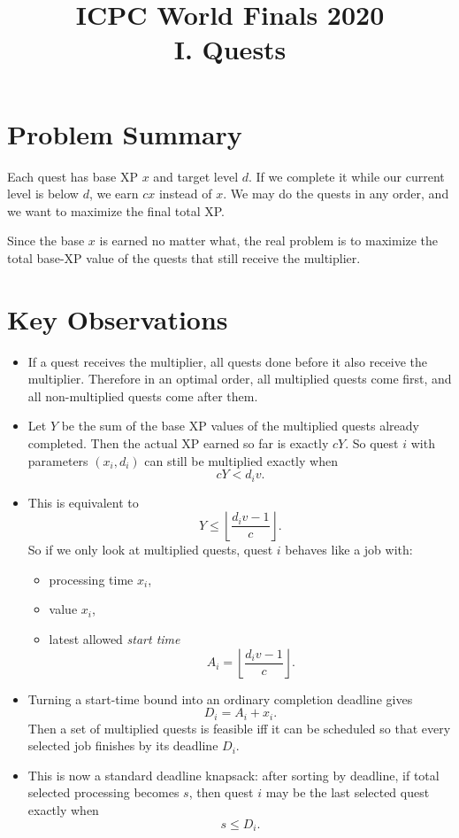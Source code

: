 \documentclass[11pt]{article}
\title{ICPC World Finals 2020\\I. Quests}
\author{}
\date{}
\begin{document}
\maketitle

\section*{Problem Summary}

Each quest has base XP $x$ and target level $d$.
If we complete it while our current level is below $d$, we earn $cx$ instead of $x$.
We may do the quests in any order, and we want to maximize the final total XP.

Since the base $x$ is earned no matter what, the real problem is to maximize the total base-XP value of
the quests that still receive the multiplier.

\section*{Key Observations}

\begin{itemize}[leftmargin=*]
    \item If a quest receives the multiplier, all quests done before it also receive the multiplier.
    Therefore in an optimal order, all multiplied quests come first, and all non-multiplied quests come
    after them.
    \item Let $Y$ be the sum of the base XP values of the multiplied quests already completed.
    Then the actual XP earned so far is exactly $cY$.
    So quest $i$ with parameters $(x_i,d_i)$ can still be multiplied exactly when
    \[
        cY < d_i v.
    \]
    \item This is equivalent to
    \[
        Y \le \left\lfloor \frac{d_i v - 1}{c} \right\rfloor.
    \]
    So if we only look at multiplied quests, quest $i$ behaves like a job with:
    \begin{itemize}[leftmargin=*]
        \item processing time $x_i$,
        \item value $x_i$,
        \item latest allowed \emph{start time}
        \[
            A_i = \left\lfloor \frac{d_i v - 1}{c} \right\rfloor.
        \]
    \end{itemize}
    \item Turning a start-time bound into an ordinary completion deadline gives
    \[
        D_i = A_i + x_i.
    \]
    Then a set of multiplied quests is feasible iff it can be scheduled so that every selected job finishes
    by its deadline $D_i$.
    \item This is now a standard deadline knapsack:
    after sorting by deadline, if total selected processing becomes $s$, then quest $i$ may be the last
    selected quest exactly when
    \[
        s \le D_i.
    \]
\end{itemize}
\end{document}
